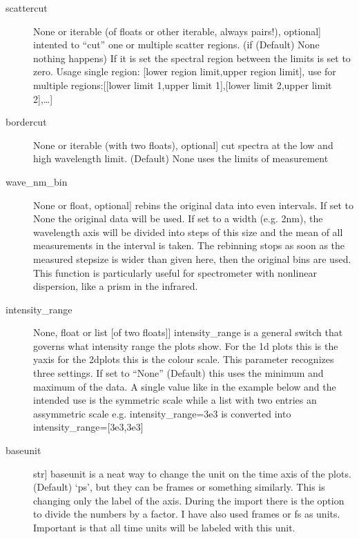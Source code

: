 \documentclass[letterpaper,10pt,english]{sphinxmanual}
\begin{document}
\begin{fulllineitems}
\begin{description}
\item[{scattercut}] \leavevmode{[}None or iterable (of floats or other iterable, always pairs!), optional{]}
intented to “cut” one or multiple scatter regions. (if (Default) None nothing
happens) If it is set the spectral region between the limits is set to zero.
Usage single region: {[}lower region limit,upper region limit{]},
use for multiple regions:{[}{[}lower limit 1,upper limit 1{]},{[}lower limit 2,upper limit 2{]},…{]}

\item[{bordercut}] \leavevmode{[}None or iterable (with two floats), optional{]}
cut spectra at the low and high wavelength limit. (Default) None
uses the limits of measurement

\item[{wave\_nm\_bin}] \leavevmode{[}None or float, optional{]}
rebins the original data into even intervals. If set to None the original data will be used.
If set to a width (e.g. 2nm), the wavelength axis will be divided into steps of this size
and the mean of all measurements in the interval is taken. The re\sphinxhyphen{}binning stops as soon as
the measured stepsize is wider than given here, then the original bins are used.
This function is particularly useful for spectrometer with non\sphinxhyphen{}linear dispersion,
like a prism in the infrared.

\item[{intensity\_range}] \leavevmode{[}None, float or list {[}of two floats{]}{]}
intensity\_range is a general switch that governs what intensity range the plots show.
For the 1d plots this is the y\sphinxhyphen{}axis for the 2d\sphinxhyphen{}plots this is the colour scale.
This parameter recognizes three settings. If set to “None” (Default) this uses the minimum and
maximum of the data. A single value like in the example below and the intended use is the symmetric
scale while a list with two entries an assymmetric scale e.g.
intensity\_range=3e\sphinxhyphen{}3 is converted into intensity\_range={[}\sphinxhyphen{}3e\sphinxhyphen{}3,3e\sphinxhyphen{}3{]}

\item[{baseunit}] \leavevmode{[}str{]}
baseunit is a neat way to change the unit on the time axis of the plots. (Default) ‘ps’, but they
can be frames or something similarly. This is changing only the label of the axis.
During the import there is the option to divide the numbers by a factor.
I have also used frames or fs as units. Important is that all time units will be labeled with
this unit.


\end{description}
\end{fulllineitems}
\end{document}
